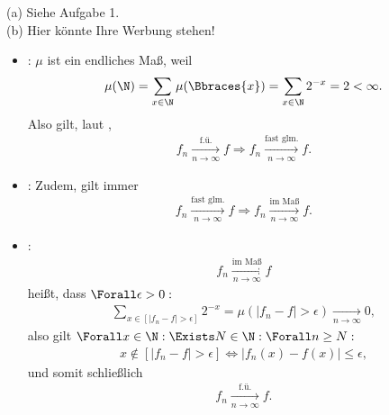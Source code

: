 \begin{solution}

(a) Siehe Aufgabe 1. \\

(b) Hier könnte Ihre Werbung stehen!

\begin{itemize}

  \item {}: $\mu$ ist ein endliches Maß, weil
  \begin{align*}
    \mu(\N)
    =
    \sum_{x \in \N} \mu(\Bbraces{x})
    =
    \sum_{x \in \N} 2^{-x}
    =
    2 < \infty.
  \end{align*}
  Also gilt, laut ,
  \begin{align*}
    f_n \xrightarrow[n \to \infty]{\text{f.ü.}} f
    \Rightarrow
    f_n \xrightarrow[n \to \infty]{\text{fast glm.}} f.
  \end{align*}

  \item {}: Zudem, gilt immer
  \begin{align*}
    f_n \xrightarrow[n \to \infty]{\text{fast glm.}} f
    \Rightarrow
    f_n \xrightarrow[n \to \infty]{\text{im Maß}} f.
  \end{align*}

  \item {}:
  \begin{align*}
    f_n \xrightarrow[n \to \infty]{\text{im Maß}} f
  \end{align*}
  heißt, dass $\Forall \epsilon > 0:$
  \begin{align*}
    \sum_{x \in [|f_n - f| > \epsilon]} 2^{-x}
    =
    \mu(|f_n - f| > \epsilon)
    \xrightarrow[n \to \infty]{} 0,
  \end{align*}
  also gilt $\Forall x \in \N: \Exists N \in \N: \Forall n \geq N:$
  \begin{align*}
    x \notin [|f_n - f| > \epsilon]
    \Leftrightarrow
    |f_n(x) - f(x)| \leq \epsilon,
  \end{align*}
  und somit schließlich
  \begin{align*}
    f_n \xrightarrow[n \to \infty]{\text{f.ü.}} f.
  \end{align*}

\end{itemize}

\end{solution}
